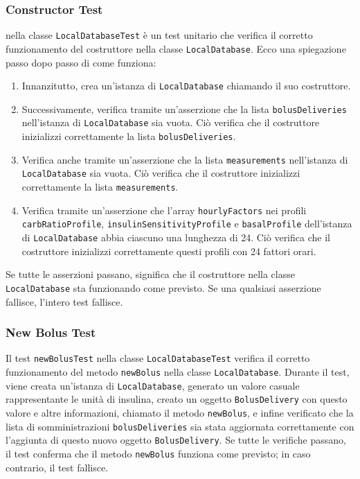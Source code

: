 \documentclass[twocolumn]{article}
\begin{document}
\subsubsection{Constructor Test}
 nella classe \texttt{LocalDatabaseTest} è un test unitario che verifica il corretto funzionamento del costruttore nella classe \texttt{LocalDatabase}. Ecco una spiegazione passo dopo passo di come funziona:
\begin{enumerate}
    \item Innanzitutto, crea un'istanza di \texttt{LocalDatabase} chiamando il suo costruttore.
    \item Successivamente, verifica tramite un'asserzione che la lista \texttt{bolusDeliveries} nell'istanza di \texttt{LocalDatabase} sia vuota. Ciò verifica che il costruttore inizializzi correttamente la lista \texttt{bolusDeliveries}.
    \item Verifica anche tramite un'asserzione che la lista \texttt{measurements} nell'istanza di \texttt{LocalDatabase} sia vuota. Ciò verifica che il costruttore inizializzi correttamente la lista \texttt{measurements}.
    \item Verifica tramite un'asserzione che l'array \texttt{hourlyFactors} nei profili \texttt{carbRatioProfile}, \texttt{insulinSensitivityProfile} e \texttt{basalProfile} dell'istanza di \texttt{LocalDatabase} abbia ciascuno una lunghezza di 24. Ciò verifica che il costruttore inizializzi correttamente questi profili con 24 fattori orari.
\end{enumerate}
Se tutte le asserzioni passano, significa che il costruttore nella classe \texttt{LocalDatabase} sta funzionando come previsto. Se una qualsiasi asserzione fallisce, l'intero test fallisce.

\subsubsection{New Bolus Test}
Il test \texttt{newBolusTest} nella classe \texttt{LocalDatabaseTest} verifica il corretto funzionamento del metodo \texttt{newBolus} nella classe \texttt{LocalDatabase}. Durante il test, viene creata un'istanza di \texttt{LocalDatabase}, generato un valore casuale rappresentante le unità di insulina, creato un oggetto \texttt{BolusDelivery} con questo valore e altre informazioni, chiamato il metodo \texttt{newBolus}, e infine verificato che la lista di somministrazioni \texttt{bolusDeliveries} sia stata aggiornata correttamente con l'aggiunta di questo nuovo oggetto \texttt{BolusDelivery}. Se tutte le verifiche passano, il test conferma che il metodo \texttt{newBolus} funziona come previsto; in caso contrario, il test fallisce.
\end{document}
